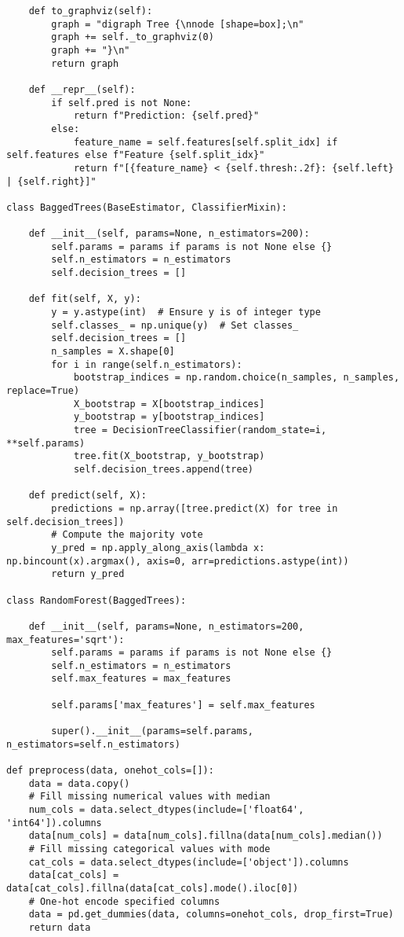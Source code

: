 \documentclass{article}
\begin{document}
\begin{enumerate}
\begin{verbatim}
    def to_graphviz(self):
        graph = "digraph Tree {\nnode [shape=box];\n"
        graph += self._to_graphviz(0)
        graph += "}\n"
        return graph

    def __repr__(self):
        if self.pred is not None:
            return f"Prediction: {self.pred}"
        else:
            feature_name = self.features[self.split_idx] if self.features else f"Feature {self.split_idx}"
            return f"[{feature_name} < {self.thresh:.2f}: {self.left} | {self.right}]"

class BaggedTrees(BaseEstimator, ClassifierMixin):

    def __init__(self, params=None, n_estimators=200):
        self.params = params if params is not None else {}
        self.n_estimators = n_estimators
        self.decision_trees = []

    def fit(self, X, y):
        y = y.astype(int)  # Ensure y is of integer type
        self.classes_ = np.unique(y)  # Set classes_
        self.decision_trees = []
        n_samples = X.shape[0]
        for i in range(self.n_estimators):
            bootstrap_indices = np.random.choice(n_samples, n_samples, replace=True)
            X_bootstrap = X[bootstrap_indices]
            y_bootstrap = y[bootstrap_indices]
            tree = DecisionTreeClassifier(random_state=i, **self.params)
            tree.fit(X_bootstrap, y_bootstrap)
            self.decision_trees.append(tree)

    def predict(self, X):
        predictions = np.array([tree.predict(X) for tree in self.decision_trees])
        # Compute the majority vote
        y_pred = np.apply_along_axis(lambda x: np.bincount(x).argmax(), axis=0, arr=predictions.astype(int))
        return y_pred

class RandomForest(BaggedTrees):

    def __init__(self, params=None, n_estimators=200, max_features='sqrt'):
        self.params = params if params is not None else {}
        self.n_estimators = n_estimators
        self.max_features = max_features

        self.params['max_features'] = self.max_features

        super().__init__(params=self.params, n_estimators=self.n_estimators)

def preprocess(data, onehot_cols=[]):
    data = data.copy()
    # Fill missing numerical values with median
    num_cols = data.select_dtypes(include=['float64', 'int64']).columns
    data[num_cols] = data[num_cols].fillna(data[num_cols].median())
    # Fill missing categorical values with mode
    cat_cols = data.select_dtypes(include=['object']).columns
    data[cat_cols] = data[cat_cols].fillna(data[cat_cols].mode().iloc[0])
    # One-hot encode specified columns
    data = pd.get_dummies(data, columns=onehot_cols, drop_first=True)
    return data


\end{verbatim}
\end{enumerate}
\end{document}
